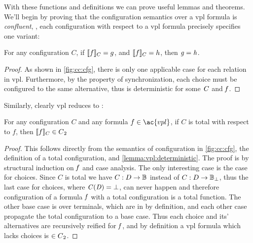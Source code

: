 With these functions and definitions we can prove useful lemmas and theorems.
%
We'll begin by proving that the configuration semantics over a \ac{vpl} formula
is \emph{confluent}, \ie{}, each configuration with respect to a \ac{vpl}
formula precisely specifies one variant:
%
\begin{lemma}
  \label{lemma:vpl:deterministic}
  For any configuration $C$, if \ensuremath{\semL f \semR_{C} = g}, and
  \ensuremath{\semL f \semR_{C} = h}, then $\mathit{g} = \mathit{h}$.
\end{lemma}
%
\begin{proof}
  As shown in \autoref{fig:cc:cfg}, there is only one applicable case for each
  relation in \ac{vpl}. Furthermore, by the property of synchronization, each
  choice must be configured to the same alternative, thus  is
  deterministic for some $\mathit{C}$ and $\mathit{f}$.
\end{proof}

Similarly, clearly \ac{vpl} reduces to \pl{}:
%
\begin{theorem}
  \label{thm:vpltopl}
  For any configuration $C$ and any formula $f \in \ac{vpl}$, if $C$ is total
  with respect to $f$, then $\sem[C]{f} \in \pl{}$
\end{theorem}
%
\begin{proof}
  This follows directly from the semantics of configuration in
  \autoref{fig:cc:cfg}, the definition of a total configuration, and
  \autoref{lemma:vpl:deterministic}. The proof is by structural induction on
  $\mathit{f}$ and case analysis. The only interesting case is the case for choices.
  Since $C$ is total we have $C : D \rightarrow \mathbb{B}{}$ instead of $C : D
  \rightarrow \mathbb{B}{}_{\bot}$, thus the last case for choices, where
  $\mathit{C(D)} = \bot$, can never happen and therefore configuration of a formula
  $\mathit{f}$ with a total configuration is a total function. The other base case
  is over terminals, which are in \pl{} by definition, and each other case
  propagate the total configuration to a base case. Thus each choice and its'
  alternatives are recursively reified for $\mathit{f}$, and by definition a
  \ac{vpl} formula which lacks choices is $\in {C\textsubscript{2}}{}$.
\end{proof}



